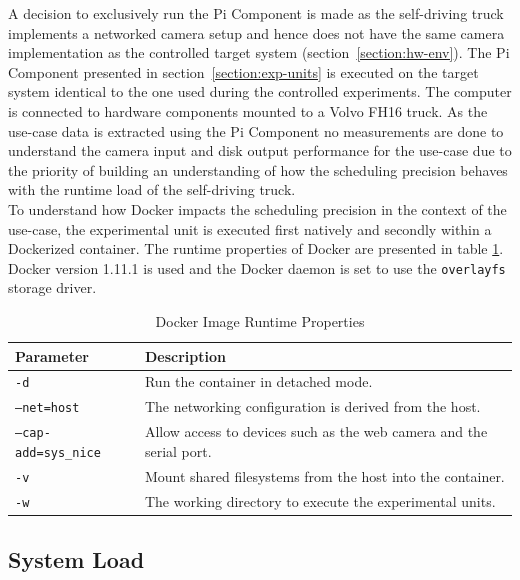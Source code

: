 A decision to exclusively run the Pi Component is made as the self-driving truck implements a networked camera setup and hence does not have the same camera implementation as the controlled target system (section~\ref{section:hw-env}). The Pi Component presented in section~\ref{section:exp-units} is executed on the target system identical to the one used during the controlled experiments. The computer is connected to hardware components mounted to a Volvo FH16 truck. As the use-case data is extracted using the Pi Component no measurements are done to understand the camera input and disk output performance for the use-case due to the priority of building an understanding of how the scheduling precision behaves with the runtime load of the self-driving truck.\\

To understand how Docker impacts the scheduling precision in the context of the use-case, the experimental unit is executed first natively and secondly within a Dockerized container. The runtime properties of Docker are presented in table \ref{docker-parameters-truck}. Docker version 1.11.1 is used and the Docker daemon is set to use the \texttt{overlayfs} storage driver.



\begin{table}[ht]
\centering
\caption{Docker Image Runtime Properties}
\label{docker-parameters-truck}
\begin{tabular}{|l|p{10cm}|}
\hline
\textbf{Parameter}           & \textbf{Description}                                            \\ \hline
\texttt{-d}                  & Run the container in detached mode.                             \\ \hline
\texttt{--net=host}          & The networking configuration is derived from the host.          \\ \hline
\texttt{--cap-add=sys\_nice} & Allow access to devices such as the web camera and the serial port. \\ \hline
\texttt{-v}                  & Mount shared filesystems from the host into the container.    \\ \hline
\texttt{-w}                  & The working directory to execute the experimental units.               \\ \hline
\end{tabular}
\end{table}


\subsection{System Load}
\label{sec:truck-load}

